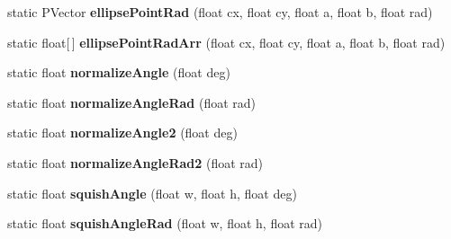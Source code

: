 \begin{DoxyCompactItemize}
\item 
\hypertarget{classhype_1_1core_1_1util_1_1_h_math_a403da3a14efae0826c91ac648043575c}{static P\-Vector {\bfseries ellipse\-Point\-Rad} (float cx, float cy, float a, float b, float rad)}\label{classhype_1_1core_1_1util_1_1_h_math_a403da3a14efae0826c91ac648043575c}

\item 
\hypertarget{classhype_1_1core_1_1util_1_1_h_math_ab3ad5e2742d09e08090d5d34a46670be}{static float\mbox{[}$\,$\mbox{]} {\bfseries ellipse\-Point\-Rad\-Arr} (float cx, float cy, float a, float b, float rad)}\label{classhype_1_1core_1_1util_1_1_h_math_ab3ad5e2742d09e08090d5d34a46670be}

\item 
\hypertarget{classhype_1_1core_1_1util_1_1_h_math_a6f3e4a9e9a5d64e601633d5f6547990f}{static float {\bfseries normalize\-Angle} (float deg)}\label{classhype_1_1core_1_1util_1_1_h_math_a6f3e4a9e9a5d64e601633d5f6547990f}

\item 
\hypertarget{classhype_1_1core_1_1util_1_1_h_math_abce08c4bf800136a0129805649d9e391}{static float {\bfseries normalize\-Angle\-Rad} (float rad)}\label{classhype_1_1core_1_1util_1_1_h_math_abce08c4bf800136a0129805649d9e391}

\item 
\hypertarget{classhype_1_1core_1_1util_1_1_h_math_a777a01f4aa30a113b3a6bfab8de15526}{static float {\bfseries normalize\-Angle2} (float deg)}\label{classhype_1_1core_1_1util_1_1_h_math_a777a01f4aa30a113b3a6bfab8de15526}

\item 
\hypertarget{classhype_1_1core_1_1util_1_1_h_math_ae12c1fd45ba95fe0435f9c164ab66c31}{static float {\bfseries normalize\-Angle\-Rad2} (float rad)}\label{classhype_1_1core_1_1util_1_1_h_math_ae12c1fd45ba95fe0435f9c164ab66c31}

\item 
\hypertarget{classhype_1_1core_1_1util_1_1_h_math_a35bd7cb644db9246f8eae66b5ca6b4eb}{static float {\bfseries squish\-Angle} (float w, float h, float deg)}\label{classhype_1_1core_1_1util_1_1_h_math_a35bd7cb644db9246f8eae66b5ca6b4eb}

\item 
\hypertarget{classhype_1_1core_1_1util_1_1_h_math_a40275ffba597fae3edee05bdf6112529}{static float {\bfseries squish\-Angle\-Rad} (float w, float h, float rad)}\label{classhype_1_1core_1_1util_1_1_h_math_a40275ffba597fae3edee05bdf6112529}


\end{DoxyCompactItemize}
